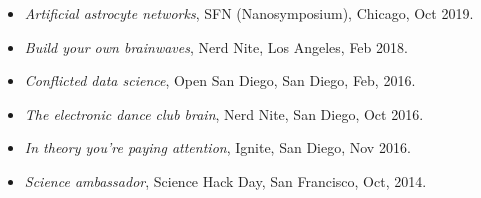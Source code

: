 \begin{itemize}
\tightlist
\item
  \emph{Artificial astrocyte networks}, SFN (Nanosymposium), Chicago,
  Oct 2019.
\item
  \emph{Build your own brainwaves}, Nerd Nite, Los Angeles, Feb 2018.
\item
  \emph{Conflicted data science}, Open San Diego, San Diego, Feb, 2016.
\item
  \emph{The electronic dance club brain}, Nerd Nite, San Diego, Oct
  2016.
\item
  \emph{In theory you're paying attention}, Ignite, San Diego, Nov 2016.
\item
  \emph{Science ambassador}, Science Hack Day, San Francisco, Oct, 2014.
\end{itemize}
